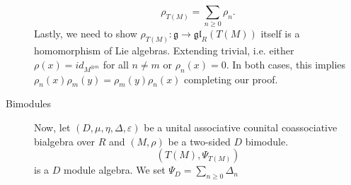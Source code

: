\documentclass[10pt,a4paper]{article}
\newcommand{\lie}{\mathfrak{g}}
\begin{document}
\begin{description}
$$\rho_{T(M)} = \sum_{n \geq 0} \rho_n.$$
Lastly, we need to show $\rho_{T(M)} : \lie \longrightarrow \mathfrak{gl}_R(T(M))$ itself is a homomorphism of Lie algebras. Extending trivial, i.e. either $\rho(x) = id_{M^{\otimes m}}$ for all $n \neq m$ or $\rho_n(x) = 0$. In both cases, this implies $\rho_n(x) \rho_m(y) = \rho_m(y) \rho_n(x)$ completing our proof.
\newcommand{\eps}{\varepsilon}
\item[Bimodules] Now, let $(D,\mu,\eta,\Delta,\eps)$ be a unital associative counital coassociative bialgebra over $R$ and $(M, \rho)$ be a two-sided $D$ bimodule.
$$\left(T(M), \Psi_{T(M)}\right)$$
is a $D$ module algebra. We set $\Psi_D = \sum_{n \geq 0} \Delta_n$
\end{description}
\end{document}
